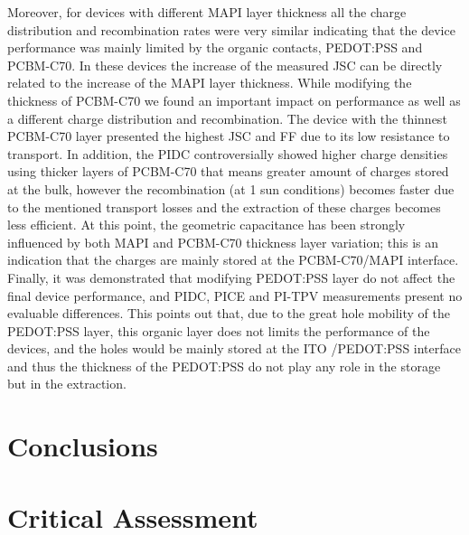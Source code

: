 Moreover, for devices with different MAPI layer thickness all the charge distribution and recombination rates were very similar indicating that the device performance was mainly limited by the organic contacts, PEDOT:PSS and PCBM-C70. In these devices the increase of the measured JSC can be directly related to the increase of the MAPI layer thickness. While modifying the thickness of PCBM-C70 we found an important impact on performance as well as a different charge distribution and recombination. The device with the thinnest PCBM-C70 layer presented the highest JSC and FF due to its low resistance to transport. In addition, the PIDC controversially showed higher charge densities using thicker layers of PCBM-C70 that means greater amount of charges stored at the bulk, however the recombination (at 1 sun conditions) becomes faster due to the mentioned transport losses and the extraction of these charges becomes less efficient. At this point, the geometric capacitance has been strongly influenced by both MAPI and PCBM-C70 thickness layer variation; this is an indication that the charges are mainly stored at the PCBM-C70/MAPI interface.
Finally, it was demonstrated that modifying PEDOT:PSS layer do not affect the final device performance, and PIDC, PICE and PI-TPV measurements present no evaluable differences. This points out that, due to the great hole mobility of the PEDOT:PSS layer, this organic layer does not limits the performance of the devices, and the holes would be mainly stored at the ITO /PEDOT:PSS interface and thus the thickness of the PEDOT:PSS do not play any role in the storage but in the extraction.






\section{Conclusions}
\section{Critical Assessment}




